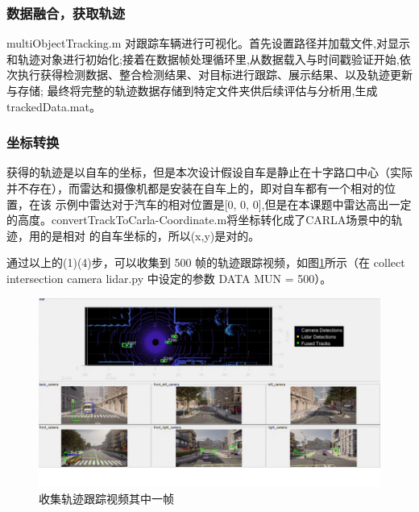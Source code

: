 \subsubsection{数据融合，获取轨迹}

multiObjectTracking.m 对跟踪车辆进行可视化。首先设置路径并加载文件,对显示和轨迹对象进行初始化;接着在数据帧处理循环里,从数据载入与时间戳验证开始,依次执行获得检测数据、整合检测结果、对目标进行跟踪、展示结果、以及轨迹更新与存储; 最终将完整的轨迹数据存储到特定文件夹供后续评估与分析用,生成 trackedData.mat。

\subsubsection{坐标转换}

获得的轨迹是以自车的坐标，但是本次设计假设自车是静止在十字路口中心（实际 并不存在），而雷达和摄像机都是安装在自车上的，即对自车都有一个相对的位置，在该 示例中雷达对于汽车的相对位置是[0, 0, 0],但是在本课题中雷达高出一定的高度。convertTrackToCarla-Coordinate.m将坐标转化成了CARLA场景中的轨迹，用的是相对 的自车坐标的，所以(x,y)是对的。


通过以上的(1)(4)步，可以收集到 500 帧的轨迹跟踪视频，如图\ref{fig:p42}所示（在 collect intersection camera lidar.py 中设定的参数 DATA MUN = 500）。




\begin{figure}[htbp] %
	\centering
	\includegraphics[width=1\textwidth]{p42} %
	\caption{收集轨迹跟踪视频其中一帧} %
	\label{fig:p42} %
\end{figure}







